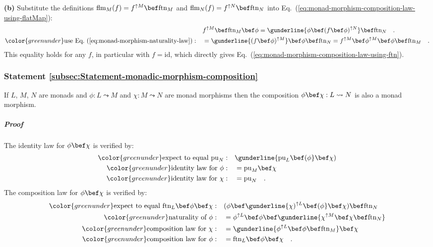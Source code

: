 \textbf{(b)} Substitute the definitions $\text{flm}_{M}(f)=f^{\uparrow M}\bef\text{ftn}_{M}$
and $\text{flm}_{N}(f)=f^{\uparrow N}\bef\text{ftn}_{N}$ into Eq.~(\ref{eq:monad-morphism-composition-law-using-flatMap}):
\begin{align*}
 & f^{\uparrow M}\bef\text{ftn}_{M}\bef\phi=\gunderline{\phi\bef(f\bef\phi)^{\uparrow N}}\bef\text{ftn}_{N}\quad.\\
{\color{greenunder}\text{use Eq.~(\ref{eq:monad-morphism-naturality-law})}:}\quad & =\gunderline{(f\bef\phi)^{\uparrow M}}\bef\phi\bef\text{ftn}_{N}=f^{\uparrow M}\bef\phi^{\uparrow M}\bef\phi\bef\text{ftn}_{M}\quad.
\end{align*}
This equality holds for any $f$, in particular with $f=\text{id}$,
which directly gives Eq.~(\ref{eq:monad-morphism-composition-law-using-ftn}).

\subsubsection{Statement \label{subsec:Statement-monadic-morphism-composition}\ref{subsec:Statement-monadic-morphism-composition}}

If $L$, $M$, $N$ are monads and $\phi:L\leadsto M$ and $\chi:M\leadsto N$
are monad morphisms then the composition $\phi\bef\chi:L\leadsto N$
is also a monad morphism.

\subparagraph{Proof}

The identity law for $\phi\bef\chi$ is verified by:
\begin{align*}
{\color{greenunder}\text{expect to equal }\text{pu}_{N}:}\quad & \gunderline{\text{pu}_{L}\bef(\phi}\bef\chi)\\
{\color{greenunder}\text{identity law for }\phi:}\quad & =\text{pu}_{M}\bef\chi\\
{\color{greenunder}\text{identity law for }\chi:}\quad & =\text{pu}_{N}\quad.
\end{align*}
The composition law for $\phi\bef\chi$ is verified by:
\begin{align*}
{\color{greenunder}\text{expect to equal }\text{ftn}_{L}\bef\phi\bef\chi:}\quad & (\phi\bef\gunderline{\chi)^{\uparrow L}\bef(\phi}\bef\chi)\bef\text{ftn}_{N}\\
{\color{greenunder}\text{naturality of }\phi:}\quad & =\phi^{\uparrow L}\bef\phi\bef\gunderline{\chi^{\uparrow M}\bef\chi\bef\text{ftn}_{N}}\\
{\color{greenunder}\text{composition law for }\chi:}\quad & =\gunderline{\phi^{\uparrow L}\bef\phi\bef\text{ftn}_{M}}\bef\chi\\
{\color{greenunder}\text{composition law for }\phi:}\quad & =\text{ftn}_{L}\bef\phi\bef\chi\quad.
\end{align*}


